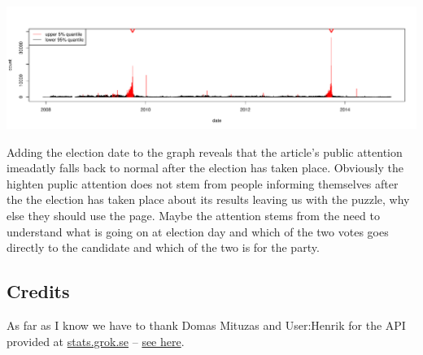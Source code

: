 \documentclass[]{article}
\newenvironment{Shaded}{\begin{snugshade}}{\end{snugshade}}
\newcommand{\KeywordTok}[1]{\textcolor[rgb]{0.13,0.29,0.53}{\textbf{{#1}}}}
\newcommand{\DataTypeTok}[1]{\textcolor[rgb]{0.13,0.29,0.53}{{#1}}}
\newcommand{\DecValTok}[1]{\textcolor[rgb]{0.00,0.00,0.81}{{#1}}}
\newcommand{\StringTok}[1]{\textcolor[rgb]{0.31,0.60,0.02}{{#1}}}
\newcommand{\NormalTok}[1]{{#1}}
\begin{document}
\begin{Shaded}
\end{Shaded}

\includegraphics{wikipediatrendblog_files/figure-latex/plotting_data-1.pdf}

Adding the election date to the graph reveals that the article's public
attention imeadatly falls back to normal after the election has taken
place. Obviously the highten puplic attention does not stem from people
informing themselves after the the election has taken place about its
results leaving us with the puzzle, why else they should use the page.
Maybe the attention stems from the need to understand what is going on
at election day and which of the two votes goes directly to the
candidate and which of the two is for the party.

\subsection{Credits}\label{credits}

As far as I know we have to thank Domas Mituzas and User:Henrik for the
API provided at \href{http://stats.grok.se/}{stats.grok.se} --
\href{http://stats.grok.se/about}{see here}.
\end{document}
